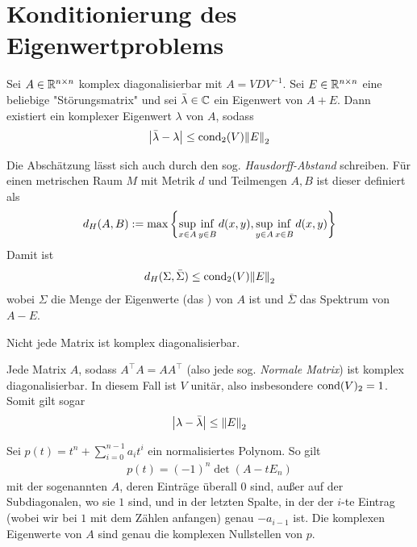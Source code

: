 \documentclass{report}
\begin{document}
	\section{Konditionierung des Eigenwertproblems}
	\begin{theorem}
		Sei $A \in \mathbb{R}^{n \times n}$ komplex diagonalisierbar mit $A = VDV^{-1}$. Sei $E \in \mathbb{R}^{n \times n}$ eine beliebige "Störungsmatrix" und sei $\bar \lambda \in \mathbb{C}$ ein Eigenwert von $A + E$. Dann existiert ein komplexer Eigenwert $\lambda$ von $A$, sodass
		\begin{align*}
			\abs{\bar \lambda - \lambda} \leq \textnormal{cond}_2(V)\norm{E}_2
		\end{align*}
	\end{theorem}
	\begin{definition}
		Die Abschätzung lässt sich auch durch den sog. \emph{Hausdorff-Abstand}
		schreiben. Für einen metrischen Raum $M$ mit Metrik $d$ und Teilmengen $A,B$ ist dieser definiert als
		\begin{align*}
			d_H(A,B) := \max \lr{\sup_{x \in A} \inf_{y \in B} d(x,y), \sup_{y \in A} \inf_{x \in B} d(x,y)}
		\end{align*}
		Damit ist
		\begin{align*}
			d_H(\Sigma, \bar \Sigma) \leq \textnormal{cond}_2(V) \norm{E}_2
		\end{align*}
		wobei $\Sigma$ die Menge der Eigenwerte (das ) von $A$ ist und $\bar \Sigma$ das Spektrum von $A - E$.
	\end{definition}
	\begin{anmerkung}
		Nicht jede Matrix ist komplex diagonalisierbar.
	\end{anmerkung}
	\begin{corollary}
		Jede Matrix $A$, sodass $A^\top A = A A^\top$ (also jede sog. \emph{Normale Matrix}) ist komplex diagonalisierbar. In diesem Fall ist $V$ unitär, also insbesondere $\textnormal{cond}(V)_2 = 1$. Somit gilt sogar
		\begin{align*}
			\abs{\lambda - \bar\lambda} \leq \norm{E}_2
		\end{align*}
	\end{corollary}
	\begin{proposition}
		Sei $p(t) = t^n + \sum_{i = 0}^{n-1} a_i t^i$ ein normalisiertes Polynom. So gilt
		\begin{align*}
			p(t) = (-1)^n \det(A - tE_n)
		\end{align*}
		mit der sogenannten  $A$, deren Einträge überall $0$ sind, außer auf der Subdiagonalen, wo sie $1$ sind, und in der letzten Spalte, in der der $i$-te Eintrag (wobei wir bei $1$ mit dem Zählen anfangen) genau $-a_{i-1}$ ist. Die komplexen Eigenwerte von $A$ sind genau die komplexen Nullstellen von $p$.
	\end{proposition}
\end{document}
